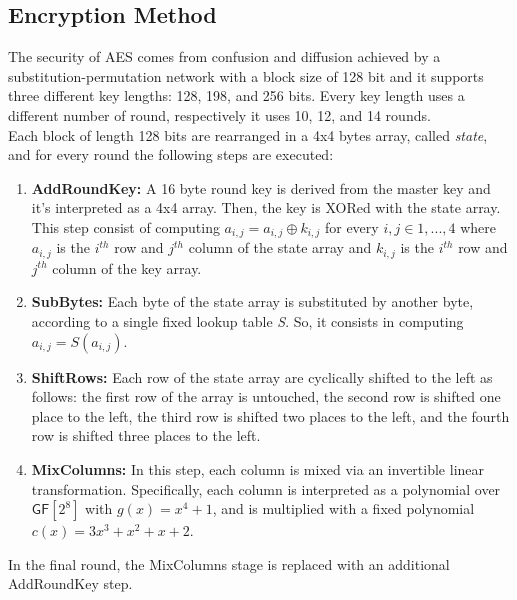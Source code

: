 \subsection{Encryption Method}
The security of AES comes from confusion and diffusion achieved by a substitution-permutation network with a block size of 128 bit and it supports three different key lengths: 128, 198, and 256 bits. Every key length uses a different number of round, respectively it uses 10, 12, and 14 rounds.\\
Each block of length 128 bits are rearranged in a 4x4 bytes array, called \emph{state}, and for every round the following steps are executed:
\begin{enumerate}
    \item{\textbf{AddRoundKey:} A 16 byte round key is derived from the master key and it's interpreted as a 4x4 array. Then, the key is XORed with the state array.\\This step consist of computing $a_{i,j} = a_{i,j} \oplus k_{i,j}$ for every $i,j \in {1,...,4}$ where $a_{i,j}$ is the $i^{th}$ row and $j^{th}$ column of the state array and $k_{i,j}$ is the $i^{th}$ row and $j^{th}$ column of the key array.}
    \item{\textbf{SubBytes:} Each byte of the state array is substituted by another byte, according to a single fixed lookup table \emph{S}. So, it consists in computing $a_{i,j} = S(a_{i,j})$.}
    \item{\textbf{ShiftRows:} Each row of the state array are cyclically shifted to the left as follows: the first row of the array is untouched, the second row is shifted one place to the left, the third row is shifted two places to the left, and the fourth row is shifted three places to the left.}
    \item{\textbf{MixColumns:} In this step, each column is mixed via an invertible linear transformation. Specifically, each column is interpreted as a polynomial over $\mathsf{GF}[2^8]$ with $g(x) = x^4 + 1$, and is multiplied with a fixed polynomial $c(x) = 3x^3 + x^2 + x + 2$.}
\end{enumerate}
In the final round, the MixColumns stage is replaced with an additional AddRoundKey step.
